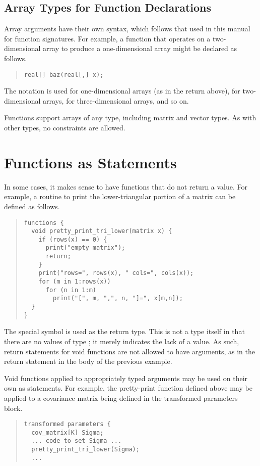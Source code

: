 \subsection{Array Types for Function Declarations}

Array arguments have their own syntax, which follows that used in this
manual for function signatures.  For example, a function that operates
on a two-dimensional array to produce a one-dimensional array might be
declared as follows.
%
\begin{quote}
\begin{Verbatim}
real[] baz(real[,] x);
\end{Verbatim}
\end{quote}
%
The notation \code{[\,]} is used for one-dimensional arrays (as in the
return above), \code{[\,,\,]} for two-dimensional arrays,
\code{[\,,\,,\,]} for three-dimensional arrays, and so on.  

Functions support arrays of any type, including matrix and vector
types.  As with other types, no constraints are allowed.


\section{Functions as Statements}

In some cases, it makes sense to have functions that do not return a
value.  For example, a routine to print the lower-triangular portion
of a matrix can be defined as follows.
%
\begin{quote}
\begin{Verbatim}
functions {
  void pretty_print_tri_lower(matrix x) {
    if (rows(x) == 0) {
      print("empty matrix");
      return;
    }
    print("rows=", rows(x), " cols=", cols(x));
    for (m in 1:rows(x))
      for (n in 1:m)
        print("[", m, ",", n, "]=", x[m,n]);
  }
}
\end{Verbatim}
\end{quote}
%
The special symbol  is used as the return type.  This is
not a type itself in that there are no values of type ; it
merely indicates the lack of a value.  As such, return statements for
void functions are not allowed to have arguments, as in the return
statement in the body of the previous example.

Void functions applied to appropriately typed arguments may be used on
their own as statements.  For example, the pretty-print function
defined above may be applied to a covariance matrix being defined in
the transformed parameters block. 
%
\begin{quote}
\begin{Verbatim}
transformed parameters {
  cov_matrix[K] Sigma;
  ... code to set Sigma ...
  pretty_print_tri_lower(Sigma);
  ...
\end{Verbatim}
\end{quote}


